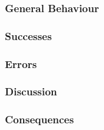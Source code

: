 \documentclass[english]{acm_proc_article-sp}
\begin{document}
\subsubsection{General Behaviour}
\subsubsection{Successes}
\subsubsection{Errors}
\subsubsection{Discussion}
\subsubsection{Consequences}
\end{document}
